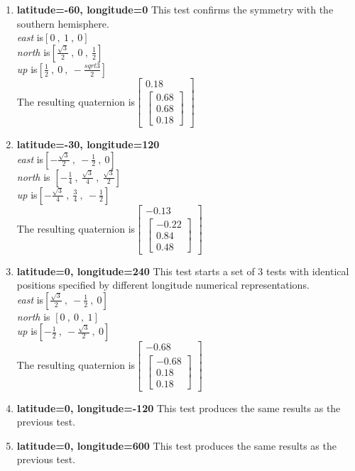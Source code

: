 \documentclass[11pt,fleqn]{report}
\begin{document}
\begin{enumerate}
\item \textbf{latitude=-60, longitude=0} This test confirms the symmetry
with the southern hemisphere.\\
\textit{east} is$[0~,~1~,~0]$ \\
\textit{north} is$[\frac{\sqrt3}{2}~,~0~,~\frac{1}{2}]$ \\
\textit{up} is$[\frac{1}{2}~,~0~,~-\frac{sqrt3}{2}]$ \\
The resulting quaternion is$
\begin{bmatrix} 0.18 \\
\begin{bmatrix} 0.68 \\
0.68 \\
0.18
\end{bmatrix}
\end{bmatrix}$

\item \textbf{latitude=-30, longitude=120} \\
\textit{east} is$[-\frac{\sqrt3}{2}~,~-\frac{1}{2}~,~0]$ \\
\textit{north} is $[-\frac{1}{4}~,~\frac{\sqrt3}{4}~,
~\frac{\sqrt3}{2}]$ \\
\textit{up} is$[-\frac{\sqrt3}{4}~,~\frac{3}{4}~,~-\frac{1}{2}]$ \\
The resulting quaternion is$
\begin{bmatrix} -0.13 \\
\begin{bmatrix} -0.22 \\
0.84 \\
0.48
\end{bmatrix}
\end{bmatrix}$

\item \textbf{latitude=0, longitude=240} This test starts a set of 3 tests
with identical positions specified by different longitude
numerical representations.\\
\textit{east} is$[\frac{\sqrt3}{2}~,~-\frac{1}{2}~,~0]$ \\
\textit{north} is $[0~,~0~,~1]$ \\
\textit{up} is$[-\frac{1}{2}~,~-\frac{\sqrt3}{2}~,~0]$ \\
The resulting quaternion is$
\begin{bmatrix} -0.68 \\
\begin{bmatrix} -0.68 \\
0.18 \\
0.18
\end{bmatrix}
\end{bmatrix}$

\item \textbf{latitude=0, longitude=-120}
This test produces the same results as the previous test.

\item \textbf{latitude=0, longitude=600}
This test produces the same results as the previous test.

\end{enumerate}
\end{document}
